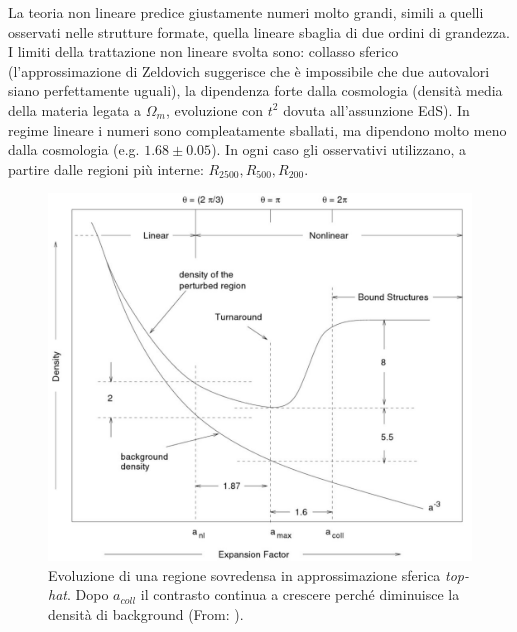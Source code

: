 La teoria non lineare predice giustamente numeri molto grandi, simili a quelli osservati nelle strutture formate, quella lineare sbaglia di due ordini di grandezza. I limiti della trattazione non lineare svolta sono: collasso sferico (l'approssimazione di Zeldovich suggerisce che è impossibile che due autovalori siano perfettamente uguali), la dipendenza forte dalla cosmologia (densità media della materia legata a $\Omega_m$, evoluzione con $t^2$ dovuta all'assunzione EdS). In regime lineare i numeri sono compleatamente sballati, ma dipendono molto meno dalla cosmologia (e.g. $1.68\pm 0.05$). In ogni caso gli osservativi utilizzano, a partire dalle regioni più interne: $R_{2500}, R_{500}, R_{200}$.

\begin{figure}[H]
    \centering
    \includegraphics[width=.75 \textwidth]{Pictures/9/Padmanabhan.jpg}
    \caption{Evoluzione di una regione sovredensa in approssimazione sferica \textit{top-hat}. Dopo $a_{coll}$ il contrasto continua a crescere perché diminuisce la densità di background (From: \cite{padmanabhan2002}).}
\end{figure}



